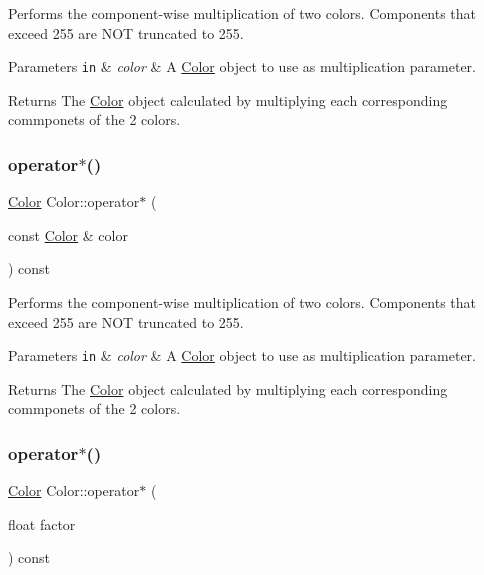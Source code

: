 Performs the component-\/wise multiplication of two colors. Components that exceed 255 are N\+OT truncated to 255. 


\begin{DoxyParams}[1]{Parameters}
\mbox{\tt in}  & {\em color} & A \hyperlink{classColor}{Color} object to use as multiplication parameter.\\
\hline
\end{DoxyParams}
\begin{DoxyReturn}{Returns}
The \hyperlink{classColor}{Color} object calculated by multiplying each corresponding commponets of the 2 colors. 
\end{DoxyReturn}
\mbox{\label{classColor_a6cc052b0ca852fb8703e642e49fcdbe9}} 
\subsubsection{\texorpdfstring{operator$\ast$()}{operator*()}\hspace{0.1cm}{\footnotesize\ttfamily [2/4]}}
{\footnotesize\ttfamily \hyperlink{classColor}{Color} Color\+::operator$\ast$ (\begin{DoxyParamCaption}\item[{const \hyperlink{classColor}{Color} \&}]{color }\end{DoxyParamCaption}) const}



Performs the component-\/wise multiplication of two colors. Components that exceed 255 are N\+OT truncated to 255. 


\begin{DoxyParams}[1]{Parameters}
\mbox{\tt in}  & {\em color} & A \hyperlink{classColor}{Color} object to use as multiplication parameter.\\
\hline
\end{DoxyParams}
\begin{DoxyReturn}{Returns}
The \hyperlink{classColor}{Color} object calculated by multiplying each corresponding commponets of the 2 colors. 
\end{DoxyReturn}
\mbox{\label{classColor_a1913ac35b2deeabf7f9bc449deae499e}} 
\subsubsection{\texorpdfstring{operator$\ast$()}{operator*()}\hspace{0.1cm}{\footnotesize\ttfamily [3/4]}}
{\footnotesize\ttfamily \hyperlink{classColor}{Color} Color\+::operator$\ast$ (\begin{DoxyParamCaption}\item[{float}]{factor }\end{DoxyParamCaption}) const}



